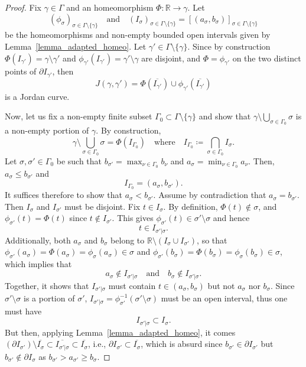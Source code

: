 \documentclass[10pt,a4paper]{amsart}
\newcommand{\R}{\mathbb{R}}
\begin{document}
\begin{proof}
    Fix $\gamma\in\Gamma$ and an homeomorphism $\Phi:\R\to\gamma$. Let 
        \[(\phi_\sigma)_{\sigma\in\Gamma\setminus\{\gamma\}}\quad\text{and}\quad(I_\sigma)_{\sigma\in\Gamma\setminus\{\gamma\}}=[(a_\sigma,b_\sigma)]_{\sigma\in\Gamma\setminus\{\gamma\}}\]
    be the homeomorphisms and non-empty bounded open intervals given by Lemma~\ref{lemma_adapted_homeo}. Let $\gamma'\in\Gamma\setminus\{\gamma\}$. Since by construction $\Phi(I_{\gamma'})=\gamma\setminus\gamma'$ and $\phi_{\gamma'}(I_{\gamma'})=\gamma'\setminus\gamma$ are disjoint, and $\Phi=\phi_{\gamma'}$ on the two distinct points of $\partial I_{\gamma'}$, then
        \[J(\gamma,\gamma')=\Phi(\overline{I_{\gamma'}})\cup\phi_{\gamma'}(\overline{I_{\gamma'}})\]
    is a Jordan curve.

    Now, let us fix a non-empty finite subset $\Gamma_0\subset\Gamma\setminus\{\gamma\}$ and show that $\gamma\setminus\bigcup_{\sigma\in\Gamma_0}\sigma$ is a non-empty portion of $\gamma$. By construction,
        \[\gamma\setminus\bigcup_{\sigma\in\Gamma_0}\sigma=\Phi(I_{\Gamma_0})\quad\text{where}\quad I_{\Gamma_0}\coloneqq\bigcap_{\sigma\in\Gamma_0}I_\sigma.\]
    Let $\sigma,\sigma'\in\Gamma_0$ be such that $b_{\sigma'}=\max_{\nu\in\Gamma_0} b_\nu$ and $a_{\sigma}=\min_{\nu\in\Gamma_0} a_\nu$. Then, $a_{\sigma}\leq b_{\sigma'}$ and
        \[I_{\Gamma_0}=(a_{\sigma}, b_{\sigma'}).\]
    It suffices therefore to show that $a_{\sigma}<b_{\sigma'}$. Assume by contradiction that $a_{\sigma}=b_{\sigma'}$. Then $I_{\sigma}$ and $I_{\sigma'}$ must be disjoint. Fix $t\in I_{\sigma}$. By definition, $\Phi(t)\notin\sigma$, and $\phi_{\sigma'}(t)=\Phi(t)$ since $t\notin I_{\sigma'}$. This gives $\phi_{\sigma'}(t)\in\sigma'\setminus\sigma$ and hence
        \[t\in I_{\sigma'|\sigma}.\]
    Additionally, both $a_{\sigma}$ and $b_{\sigma}$ belong to $\R\setminus(I_{\sigma}\cup I_{\sigma'})$, so that $\phi_{\sigma'}(a_{\sigma})=\Phi(a_{\sigma})=\phi_{\sigma}(a_{\sigma})\in\sigma$ and $\phi_{\sigma'}(b_{\sigma})=\Phi(b_{\sigma})=\phi_{\sigma}(b_{\sigma})\in\sigma$, which implies that
        \[a_{\sigma}\notin I_{\sigma'|\sigma}\quad\text{and}\quad b_{\sigma}\notin I_{\sigma'|\sigma}.\]
    Together, it shows that $I_{\sigma'|\sigma}$ must contain $t\in(a_\sigma,b_\sigma)$ but not $a_\sigma$ nor $b_\sigma$. Since $\sigma'\setminus\sigma$ is a portion of $\sigma'$, $I_{\sigma'|\sigma}=\phi_{\sigma'}^{-1}(\sigma'\setminus\sigma)$ must be an open interval, thus one must have
        \[I_{\sigma'|\sigma}\subset I_\sigma.\]
    But then, applying Lemma~\ref{lemma_adapted_homeo}, it comes $(\partial I_{\sigma'})\setminus\overline{I_\sigma}\subset\overline{I_{\sigma'|\sigma}}\subset\overline{I_\sigma}$, i.e., $\partial I_{\sigma'}\subset\overline{I_\sigma}$, which is absurd since $b_{\sigma'}\in\partial I_{\sigma'}$ but $b_{\sigma'}\notin\partial I_\sigma$ as $b_{\sigma'}>a_{\sigma'}\geq b_\sigma$.


\end{proof}
\end{document}
